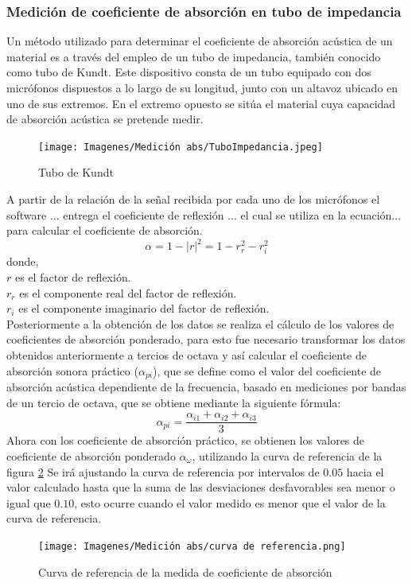 \subsubsection{Medición de coeficiente de absorción en tubo de impedancia}
Un método utilizado para determinar el coeficiente de absorción acústica de un material es a través del empleo de un tubo de impedancia, también conocido como tubo de Kundt. Este dispositivo consta de un tubo equipado con dos micrófonos dispuestos a lo largo de su longitud, junto con un altavoz ubicado en uno de sus extremos. En el extremo opuesto se sitúa el material cuya capacidad de absorción acústica se pretende medir.
\begin{figure}[H]
    \centering
    \texttt{[image: Imagenes/Medición abs/TuboImpedancia.jpeg]}
    \caption{Tubo de Kundt}
    \label{fig: Tubo de Kundt}
\end{figure}
A partir de la relación de la señal recibida por cada uno de los micrófonos el software ... entrega el coeficiente de reflexión ... el cual se utiliza en la ecuación... para calcular el coeficiente de absorción.
\begin{equation} \label{eq: alpha}
    \alpha = 1 - |r|^2 = 1 - r_{r}^2 - r_{i}^2
\end{equation}
donde,\\
$r$ es el factor de reflexión.\\
$r_{r}$ es el componente real del factor de reflexión.\\
$r_{i}$ es el componente imaginario del factor de reflexión.\cite{ISO10534-2}\\
Posteriormente a la obtención de los datos se realiza el cálculo de los valores de coeficientes de
absorción ponderado, para esto fue necesario transformar los datos obtenidos anteriormente a tercios
de octava y así calcular el coeficiente de absorción sonora práctico ($\alpha_{pi}$), que se define como el valor
del coeficiente de absorción acústica dependiente de la frecuencia, basado en mediciones por bandas
de un tercio de octava, que se obtiene mediante la siguiente fórmula:
\begin{equation}
    \alpha_{pi} = \frac{\alpha_{i1} + \alpha_{i2} + \alpha_{i3}}{3}
\end{equation}
Ahora con los coeficiente de absorción práctico, se obtienen los valores de coeficiente de absorción
ponderado $\alpha_{\omega}$, utilizando la curva de referencia de la figura \ref{fig: curva de referencia} Se irá ajustando la curva de referencia
por intervalos de $0.05$ hacia el valor calculado hasta que la suma de las desviaciones desfavorables
sea menor o igual que $0.10$, esto ocurre cuando el valor medido es menor que el valor de la curva de
referencia. \cite{ISO11654}
\begin{figure}[H]
    \centering
    \texttt{[image: Imagenes/Medición abs/curva de referencia.png]}
    \caption{Curva de referencia de la medida de coeficiente de absorción}
    \label{fig: curva de referencia}
\end{figure}

